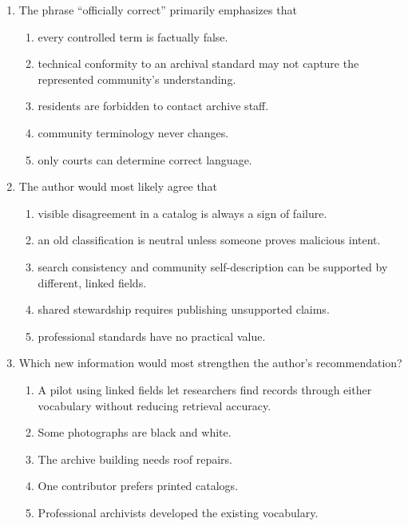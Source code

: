 \begin{enumerate}
\item The phrase ``officially correct'' primarily emphasizes that
\begin{enumerate}
\item[(A)] every controlled term is factually false.
\item[(B)] technical conformity to an archival standard may not capture the represented community's understanding.
\item[(C)] residents are forbidden to contact archive staff.
\item[(D)] community terminology never changes.
\item[(E)] only courts can determine correct language.
\end{enumerate}

\item The author would most likely agree that
\begin{enumerate}
\item[(A)] visible disagreement in a catalog is always a sign of failure.
\item[(B)] an old classification is neutral unless someone proves malicious intent.
\item[(C)] search consistency and community self-description can be supported by different, linked fields.
\item[(D)] shared stewardship requires publishing unsupported claims.
\item[(E)] professional standards have no practical value.
\end{enumerate}

\item Which new information would most strengthen the author's recommendation?
\begin{enumerate}
\item[(A)] A pilot using linked fields let researchers find records through either vocabulary without reducing retrieval accuracy.
\item[(B)] Some photographs are black and white.
\item[(C)] The archive building needs roof repairs.
\item[(D)] One contributor prefers printed catalogs.
\item[(E)] Professional archivists developed the existing vocabulary.
\end{enumerate}


\end{enumerate}
